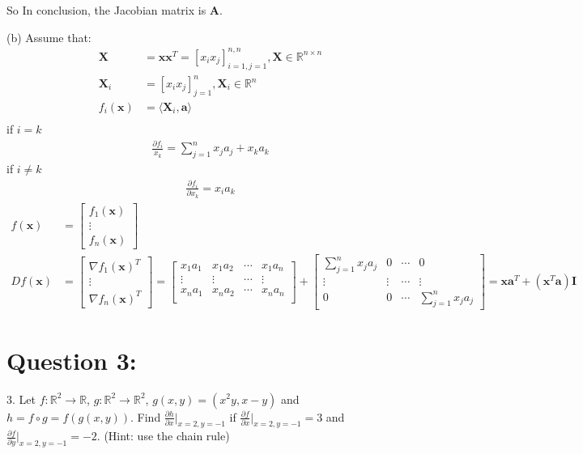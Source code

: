 \documentclass[a4paper,12pt]{article}
\newcommand{\R}{\mathbb{R}}
\begin{document}
\noindent
So In conclusion, the Jacobian matrix is \(\bm{A}\).

\vspace{1cm}
\noindent
(b) 
Assume that:
\begin{align*}
    \bm{X} &= \bm{x} \bm{x}^T= [x_i x_j]_{i = 1, j = 1}^{n, n}, \bm{X} \in \R^{n \times n} \\ 
    \bm{X}_i &= [x_ix_j]_{j=1}^n, \bm{X}_i \in \R^n\\
    f_i(\bm{x}) &= \langle \bm{X}_i, \bm{a} \rangle \\
\end{align*}
if \(i = k\)
\begin{align*}
   \frac{\partial f_i}{x_k} = \sum_{j=1}^n x_ja_j + x_ka_k
\end{align*}
if \(i \ne k\)
\begin{align*}
    \frac{\partial f_i}{\partial x_k}  = x_ia_k
\end{align*}
\begin{align*}
    f(\bm{x}) &= \begin{bmatrix}
        f_1(\bm{x}) \\
        \vdots \\
        f_n(\bm{x})
    \end{bmatrix} \\
    Df(\bm{x}) &= \begin{bmatrix}
        \nabla f_1(\bm{x})^T \\
        \vdots \\
        \nabla f_n(\bm{x})^T     
    \end{bmatrix} = 
    \begin{bmatrix}
        x_1a_1 & x_1a_2 & \cdots & x_1a_n \\
        \vdots & \vdots & \cdots & \vdots\\ 
        x_na_1 & x_na_2 & \cdots & x_na_n \\
    \end{bmatrix} + \begin{bmatrix}
        \sum_{j=1}^{n}x_ja_j & 0 & \cdots & 0 \\
        \vdots & \vdots & \cdots & \vdots\\ 
        0 & 0 & \cdots &\sum_{j=1}^{n}x_ja_j 
    \end{bmatrix} = \bm{x}\bm{a}^T + (\bm{x}^T\bm{a})\bm{I}
\end{align*}




\section*{Question 3:}
3. Let \(f : \R^2 \to \R\), \(g : \R^2 \to \R^2\), \(g(x, y) = (x^2y, x-y)\) and \(h = f \circ g = f(g(x, y))\). Find \(\frac {\partial h}{\partial x}|_{x=2, y=-1}\) if
\(\frac{\partial f}{\partial x}|_{x=2, y=-1} = 3\) and \(\frac{\partial f}{\partial y}|_{x=2, y=-1} = -2\). (Hint: use the chain rule)
\end{document}
